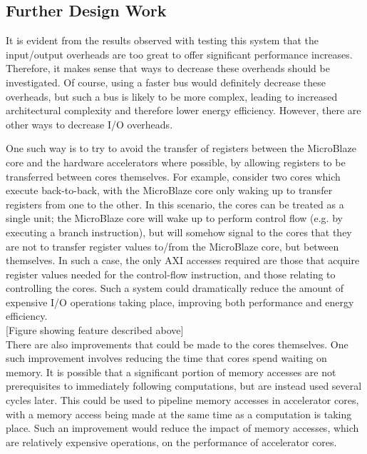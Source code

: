 \documentclass{UoYCSproject}
\begin{document}
\subsection{Further Design Work}

It is evident from the results observed with testing this system that the input/output overheads are too great to
offer significant performance increases. Therefore, it makes sense that ways to decrease these overheads should be investigated.
Of course, using a faster bus would definitely decrease these overheads, but such a bus is likely to be more complex, leading
to increased architectural complexity and therefore lower energy efficiency. However, there are other ways to decrease
I/O overheads.

One such way is to try to avoid the transfer of registers between the MicroBlaze core and the hardware accelerators where
possible, by allowing registers to be transferred between cores themselves. For example, consider two cores which
execute back-to-back, with the MicroBlaze core only waking up to transfer registers from one to the other. In this scenario,
the cores can be treated as a single unit; the MicroBlaze core will wake up to perform control flow (e.g. by executing a branch
instruction), but will somehow signal to the cores that they are not to transfer register values to/from the MicroBlaze core,
but between themselves. In such a case, the only AXI accesses required are those that acquire register values needed for the
control-flow instruction, and those relating to controlling the cores. Such a system could dramatically reduce the amount
of expensive I/O operations taking place, improving both performance and energy efficiency.\\

[Figure showing feature described above]\\

There are also improvements that could be made to the cores themselves. One such improvement involves reducing the time
that cores spend waiting on memory. It is possible that a significant portion of memory accesses are not prerequisites to
immediately following computations, but are instead used several cycles later. This could be used to pipeline memory accesses
in accelerator cores, with a memory access being made at the same time as a computation is taking place. Such an improvement
would reduce the impact of memory accesses, which are relatively expensive operations, on the performance of accelerator cores.\\
\end{document}
